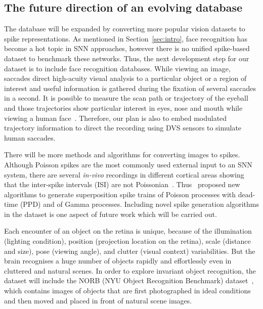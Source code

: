 \documentclass{frontiersENG} %
\begin{document}
\subsection{The future direction of an evolving database}
The database will be expanded by converting more popular vision datasets to spike representations.
As mentioned in Section~\ref{sec:intro}, face recognition has become a hot topic in SNN approaches, however there is no unified spike-based dataset to benchmark these networks.
Thus, the next development step for our dataset is to include face recognition databases.
While viewing an image, saccades direct high-acuity visual analysis to a particular object or a region of interest and useful information is gathered during the fixation of several saccades in a second.
It is possible to measure the scan path or trajectory of the eyeball and those trajectories show particular interest in eyes, nose and mouth while viewing a human face~\citep{yarbus1967eye}.
Therefore, our plan is also to embed modulated trajectory information to direct the recording using DVS sensors to simulate human saccades.

There will be more methods and algorithms for converting images to spikes.
Although Poisson spikes are the most commonly used external input to an SNN system, there are several \textit{in-vivo} recordings in different cortical areas showing that the inter-spike intervals (ISI) are not Poissonian~\citep{deger2012statistical}. 
Thus~\citet{deger2012statistical} proposed new algorithms to generate superposition spike trains of Poisson processes with dead-time (PPD) and of Gamma processes.
Including novel spike generation algorithms in the dataset is one aspect of future work which will be carried out.

Each encounter of an object on the retina is unique, because of the illumination (lighting condition), position (projection location on the retina), scale (distance and size), pose (viewing angle), and clutter (visual context) variabilities.
But the brain recognises a huge number of objects rapidly and effortlessly even in cluttered and natural scenes.
In order to explore invariant object recognition, the dataset will include the NORB (NYU Object Recognition Benchmark) dataset~\citep{lecun2004learning}, which contains images of objects that are first photographed in ideal conditions and then moved and placed in front of natural scene images.
\end{document}
